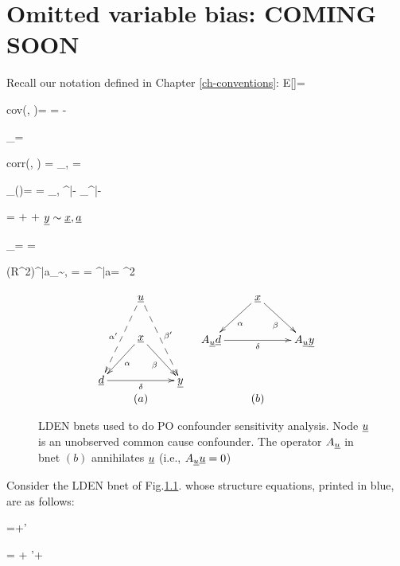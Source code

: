 \chapter{Omitted variable bias: COMING SOON}
\label{ch-omitted-var-bias}

Recall our notation defined in Chapter \ref{ch-conventions}:
\beq
E[\rva]=\av{\rva}
\eeq


\beq
cov(\rva, \rvb)= \av{\rva, \rvb}=
\av{\rva\rvb}-\av{\rva}\av{\rvb}
\eeq

\beq
\s_\rva= \sqrt{\av{\rva,\rva}}
\eeq

\beq
corr(\rva, \rvb) = \rho_{\rva, \rvb}=
\frac{\av{\rva,\rvb}}{\sqrt{\av{\rva,\rva}
\av{\rvb,\rvb}}}
\eeq

\beq
\partial_\rvb\rva(\rvx)=
\frac{\av{\rvb, \rva}^{|\rvx-\rvb}}{\av{\rvb, \rvb}^{|\rvx-\rvb}}
=
\rho_{\rva, \rvb}^{|\rvx-\rvb}
\frac{\s_\rva^{|\rvx-\rvb}}
{\s_\rvb^{|\rvx-\rvb}}
\eeq



\beq
\rvy = \beta \rvx + \alp\rva + \ul{\eps}
\eeq
${\underline{y}}\sim {\underline{x}},{\underline{a}}$

\beq
\partial_\rvx \rvy=
\frac{\av{\rvx, \rvy}^{|\rva}}{\av{\rvx, \rvx}^{|\rva}} = \beta
\eeq


\beq
(R^2)^{|a}_{\rvy\sim \rvx, \rva}=
=
{\av{\rvy, \rvy}^{|a}}=
^2
\eeq

\begin{figure}[h!]
$$
\begin{array}{cc}
\xymatrix{
&\rvu\ar@{-->}[ldd]_{\alp'}
\ar@{-->}[rdd]^{\beta'}
\\
&\rvx
\ar[ld]^\alp
\ar[rd]_\beta
\\
\rvd\ar[rr]_\delta
&&\rvy
}
&
\xymatrix{
&\rvx
\ar[ld]^\alp
\ar[rd]_\beta
\\
A_\rvu\rvd\ar[rr]_\delta
&&A_\rvu\rvy
}
\\
(a)&(b)
\end{array}
$$
\caption{LDEN bnets used to do PO confounder
sensitivity analysis.
Node ${\underline{u}}$
is an unobserved common cause confounder. 
The operator $A_{\underline{u}}$ in bnet $(b)$ annihilates ${\underline{u}}$ (i.e., $A_{\underline{u}} {\underline{u}} =0$)}
\label{eq-ovb-sen-ana}
\end{figure}

Consider the LDEN bnet of Fig.\ref{eq-ovb-sen-ana}.
whose structure equations,
printed in blue, are as follows:


\beq\color{blue}
\rvd=\alp\rvx +\alp'\rvu
\eeq

\beq\color{blue}
\rvy = \beta \rvx + \beta'\rvu + \delta \rvd
\eeq

